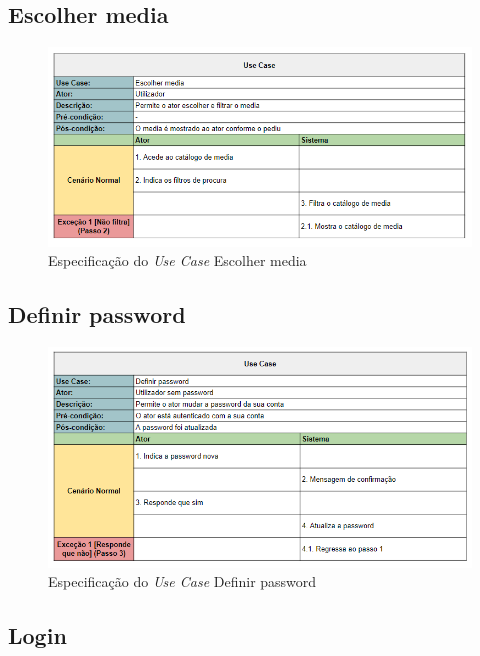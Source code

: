 \documentclass[a4paper]{report}
\begin{document}
\subsection{Escolher media}

\begin{figure}[H]
	\centering 
    \includegraphics[width=\textwidth]{images/Escolher_Media.png}  
    \caption{Especificação do \emph{Use Case} Escolher media}
\end{figure}

\subsection{Definir password}

\begin{figure}[H]
	\centering 
    \includegraphics[width=\textwidth]{images/Definir_Password.png}  
    \caption{Especificação do \emph{Use Case} Definir password}
\end{figure}

\subsection{Login}
\end{document}
